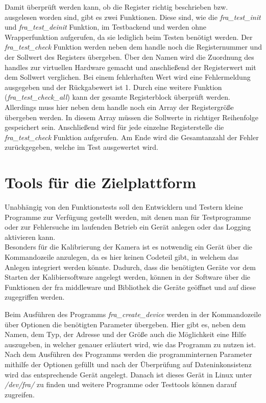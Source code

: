 Damit überprüft werden kann, ob die Register richtig beschrieben bzw. ausgelesen worden sind, gibt es zwei Funktionen. Diese sind, wie die \textit{fra\_test\_init} und \textit{fra\_test\_deinit} Funktion, im Testbackend und werden ohne Wrapperfunktion aufgerufen, da sie lediglich beim Testen benötigt werden.
Der \textit{fra\_test\_check} Funktion werden neben dem \gls{handle} noch die Registernummer und der Sollwert des Registers übergeben. Über den Namen wird die Zuordnung des \glspl{handle} zur virtuellen Hardware gemacht und anschließend der Registerwert mit dem Sollwert verglichen. Bei einem fehlerhaften Wert wird eine Fehlermeldung ausgegeben und der Rückgabewert ist 1.
Durch eine weitere Funktion (\textit{fra\_test\_check\_all}) kann der gesamte Registerblock überprüft werden. Allerdings muss hier neben dem \gls{handle} noch ein Array der Registergröße übergeben werden. In diesem Array müssen die Sollwerte in richtiger Reihenfolge gespeichert sein. Anschließend wird für jede einzelne Registerstelle die \textit{fra\_test\_check} Funktion aufgerufen. Am Ende wird die Gesamtanzahl der Fehler zurückgegeben, welche im Test ausgewertet wird.\\




\section{Tools für die Zielplattform}
Unabhängig von den Funktionstests soll den Entwicklern und Testern kleine Programme zur Verfügung gestellt werden, mit denen man für Testprogramme oder zur Fehlersuche im laufenden Betrieb ein Gerät anlegen oder das Logging aktivieren kann. \\


Besonders für die Kalibrierung der Kamera ist es notwendig ein Gerät über die Kommandozeile anzulegen, da es hier keinen Codeteil gibt, in welchem das Anlegen integriert werden könnte. Dadurch, dass die benötigten Geräte vor dem Starten der Kalibiersoftware angelegt werden, können in der Software über die Funktionen der \ac{fra} \gls{middleware} und Bibliothek die Geräte geöffnet und auf diese zugegriffen werden.


Beim Ausführen des Programms \textit{fra\_create\_device} werden in der Kommandozeile über Optionen die benötigten Parameter übergeben. Hier gibt es, neben dem Namen, dem Typ, der Adresse und der Größe auch die Möglichkeit eine Hilfe auszugeben, in welcher genauer erläutert wird, wie das Programm zu nutzen ist. 
Nach dem Ausführen des Programms werden die programminternen Parameter mithilfe der Optionen gefüllt und nach der Überprüfung auf Dateninkonsistenz wird das entsprechende Gerät angelegt. 
Danach ist dieses Gerät in Linux unter \textit{/dev/fra/} zu finden und weitere Programme oder Testtools können darauf zugreifen.\\

